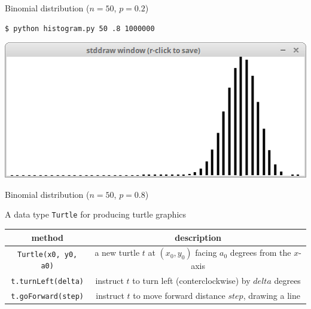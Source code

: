 \documentclass[8pt,a4paper,compress,handout]{beamer}
\begin{document}
\begin{frame}[fragile]
\begin{minipage}{100pt}
\begin{center}
\tiny Binomial distribution ($n=50$, $p=0.2$)
\end{center}
\end{minipage}%

\bigskip

\begin{minipage}{200pt}
\begin{lstlisting}[language={}]
$ python histogram.py 50 .8 1000000
\end{lstlisting}
\end{minipage}%
\hfill
\begin{minipage}{100pt}
\begin{center}
\includegraphics[scale=0.2]{figures/histogram3.png}

\smallskip

\tiny Binomial distribution ($n=50$, $p=0.8$)
\end{center}
\end{minipage}%
\end{frame}

\begin{frame}[fragile]
A data type \lstinline{Turtle} for producing turtle graphics
\begin{center}
\begin{tabular}{cc}
method & description \\ \hline
\lstinline$Turtle(x0, y0, a0)$ & a new turtle $t$ at $(x_0, y_0)$ facing $a_0$ degrees from the $x$-axis \\
\lstinline$t.turnLeft(delta)$ & instruct $t$ to turn left (conterclockwise) by $delta$ degrees \\
\lstinline$t.goForward(step)$ & instruct $t$ to move forward distance $step$, drawing a line
\end{tabular} 
\end{center}
\end{frame}
\end{document}
